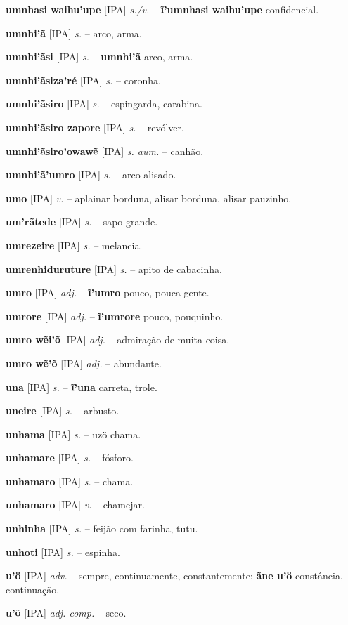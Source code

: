 \textbf{umnhasi waihu'upe} [IPA] \textit{s./v.} -- \textbf{ĩ'umnhasi waihu'upe} confidencial.

\textbf{umnhi'ã} [IPA] \textit{s.} -- arco, arma.

\textbf{umnhi'ãsi} [IPA] \textit{s.} -- \textbf{umnhi'ã} arco, arma.

\textbf{umnhi'ãsiza'ré} [IPA] \textit{s.} -- coronha.

\textbf{umnhi'ãsiro} [IPA] \textit{s.} -- espingarda, carabina.

\textbf{umnhi'ãsiro zapore} [IPA] \textit{s.} -- revólver.

\textbf{umnhi'ãsiro'owawẽ} [IPA] \textit{s. aum.} -- canhão.

\textbf{umnhi'ã'umro} [IPA] \textit{s.} -- arco alisado.

\textbf{umo} [IPA] \textit{v.} -- aplainar borduna, alisar borduna, alisar pauzinho.

\textbf{um'rãtede} [IPA] \textit{s.} -- sapo grande.

\textbf{umrezeire} [IPA] \textit{s.} -- melancia.

\textbf{umrenhiduruture} [IPA] \textit{s.} -- apito de cabacinha.

\textbf{umro} [IPA] \textit{adj.} -- \textbf{ĩ'umro} pouco, pouca gente.

\textbf{umrore} [IPA] \textit{adj.} -- \textbf{ĩ'umrore} pouco, pouquinho.

\textbf{umro wẽi'õ} [IPA] \textit{adj.} -- admiração de muita coisa.

\textbf{umro wẽ'õ} [IPA] \textit{adj.} -- abundante.

\textbf{una} [IPA] \textit{s.} -- \textbf{ĩ'una} carreta, trole.

\textbf{uneire} [IPA] \textit{s.} -- arbusto.

\textbf{unhama} [IPA] \textit{s.} -- uzö chama.

\textbf{unhamare} [IPA] \textit{s.} -- fósforo.

\textbf{unhamaro} [IPA] \textit{s.} -- chama.

\textbf{unhamaro} [IPA] \textit{v.} -- chamejar.

\textbf{unhinha} [IPA] \textit{s.} -- feijão com farinha, tutu.

\textbf{unhoti} [IPA] \textit{s.} -- espinha.

\textbf{u'ö} [IPA] \textit{adv.} -- sempre, continuamente, constantemente; \textbf{ãne u'ö} constância, continuação.

\textbf{u'õ} [IPA] \textit{adj. comp.} -- seco.

